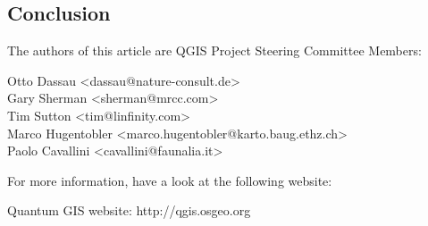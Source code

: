 \subsection{Conclusion}


The authors of this article are QGIS Project Steering Committee Members:

Otto Dassau <dassau@nature-consult.de>  
\\Gary Sherman <sherman@mrcc.com>
\\Tim Sutton <tim@linfinity.com>
\\Marco Hugentobler <marco.hugentobler@karto.baug.ethz.ch>
\\Paolo Cavallini <cavallini@faunalia.it>


For more information, have a look at the following website:

Quantum GIS website: http://qgis.osgeo.org



 



